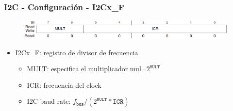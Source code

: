 \documentclass[10.5pt,scale=1.0,t,aspectratio=169,hyperref={pdfpagelabels=false}]{beamer}
\begin{document}
\begin{frame}
	\frametitle{I2C - Configuración -  I2Cx\_F}
	{\small
		\begin{figure}
			\centering
			\includegraphics[scale=0.6]{27_I2CF}
		\end{figure}
		
		\begin{itemize}
			\item I2Cx\_F: registro de divisor de frecuencia
			\begin{itemize}
				\item MULT: especifica el multiplicador mul=$2^{\texttt{MULT}}$
				\item ICR: frecuencia del clock
				\item I2C baud rate: $f_{\texttt{bus}}/ (2^{\texttt{MULT}} * \texttt{ICR}) $
			\end{itemize}
		\end{itemize}	
	}
\end{frame}
\end{document}
